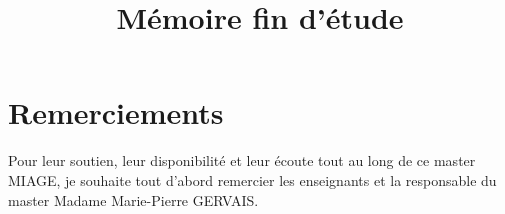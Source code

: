 \documentclass[french, a4paper, 12pt]{report}
\title{Mémoire fin d'étude }
\begin{document}





%


\newpage\null\thispagestyle{empty}\newpage
\tableofcontents
\listoffigures
\newpage\null\thispagestyle{empty}\newpage
\chapter*{Remerciements}
Pour leur soutien, leur disponibilité et leur écoute tout au long de ce master MIAGE, je souhaite tout d'abord remercier les enseignants et la responsable du master Madame Marie-Pierre GERVAIS. \\
\end{document}
